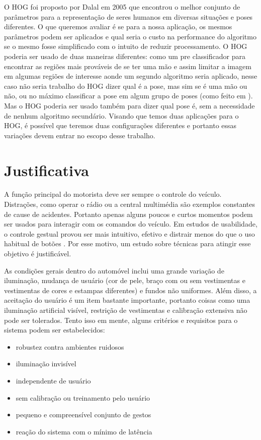 O HOG foi proposto por Dalal em 2005\cite{dalal} que encontrou o melhor conjunto de parâmetros para a representação de seres humanos em diversas situações e poses diferentes. O que queremos avaliar é se para a nossa aplicação, os mesmos parâmetros podem ser aplicados e qual seria o custo na performance do algoritmo se o mesmo fosse simplificado com o intuito de reduzir processamento.
O HOG poderia ser usado de duas maneiras diferentes: como um pre classificador para encontrar as regiões mais prováveis de se ter uma mão e assim limitar a imagem em algumas regiões de interesse aonde um segundo algoritmo seria aplicado, nesse caso não seria trabalho do HOG dizer qual é a pose, mas sim se é uma mão ou não, ou no máximo classificar a pose em algum grupo de poses (como feito em \cite{ref10}). Mas o HOG poderia ser usado também para dizer qual pose é, sem a necessidade de nenhum algoritmo secundário.
Visando que temos duas aplicações para o HOG, é possível que teremos duas configurações diferentes e portanto essas variações devem entrar no escopo desse trabalho.

\section{Justificativa}

A função principal do motorista deve ser sempre o controle do veículo. Distrações, como operar o rádio ou a central multimédia são exemplos constantes de cause de acidentes. Portanto apenas alguns poucos e curtos momentos podem ser usados para interagir com os comandos do veículo. Em estudos de usabilidade, o controle gestual provou ser mais intuitivo, efetivo \cite{ref12}  \cite{ref13} e distrair menos do que o uso habitual de botões \cite{ref14}. Por esse motivo, um estudo sobre técnicas para atingir esse objetivo é justificável.

As condições gerais dentro do automóvel inclui uma grande variação de iluminação, mudança de usuário (cor de pele, braço com ou sem vestimentas e vestimentas de cores e estampas diferentes) e fundos não uniformes. Além disso, a aceitação do usuário é um item bastante importante, portanto coisas como uma iluminação artificial visível, restrição de vestimentas e calibração extensiva não pode ser tolerados. Tento isso em mente, alguns critérios e requisitos para o sistema podem ser estabelecidos:

\begin{itemize}
\item robustez contra ambientes ruidosos
\item iluminação invisível
\item independente de usuário
\item sem calibração ou treinamento pelo usuário
\item pequeno e compreensível conjunto de gestos
\item reação do sistema com o mínimo de latência
\end{itemize}

